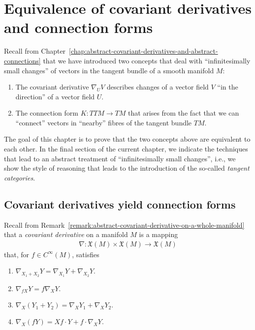 \documentclass[11pt,a4paper,twoside,openany]{report}
\theoremstyle{my-theorem}
\theoremstyle{non-theorem}
\begin{document}
	
	\chapter{Equivalence of covariant derivatives and connection forms}
	\label{chap:equivalence-of-covariant-derivative-and-connection}
	
	Recall from Chapter~\ref{chap:abstract-covariant-derivatives-and-abstract-connections} that we have introduced two concepts that deal with ``infinitesimally small changes'' of vectors in the tangent bundle of a smooth manifold $M$:
	\begin{enumerate}[label=\rm(\arabic*)]
		\item The covariant derivative $\nabla_UV$ describes changes of a vector field $V$ ``in the direction'' of a vector field $U$.
		
		\item The connection form $K:TTM\to TM$ that arises from the fact that we can ``connect'' vectors in ``nearby'' fibres of the tangent bundle $TM$.
	\end{enumerate}
	
	The goal of this chapter is to prove that the two concepts above are equivalent to each other. In the final section of the current chapter, we indicate the techniques that lead to an abstract treatment of ``infinitesimally small changes'', i.e., we show the style of reasoning that leads to the introduction of the so-called \emph{tangent categories}.
	
	\section{Covariant derivatives yield connection forms}
	
		Recall from Remark~\ref{remark:abstract-covariant-derivative-on-a-whole-manifold} that a \emph{covariant derivative} on a manifold $M$ is a mapping
		\begin{align*}
			\nabla: \mathfrak X(M) \times \mathfrak X(M) \to \mathfrak X(M)
		\end{align*}
		that, for $f \in C^\infty(M)$, satisfies
		\begin{enumerate}[label=\rm(D\arabic*)]
			\item $\nabla_{X_1+X_2}Y = \nabla_{X_1}Y + \nabla_{X_2}Y$.
			\item $\nabla_{fX}Y = f\nabla_XY$.
			\item $\nabla_X(Y_1+Y_2) = \nabla_XY_1 + \nabla_XY_2$.
			\item $\nabla_X(fY) = Xf\cdot Y + f\cdot \nabla_XY$.
		\end{enumerate}
		
\end{document}
